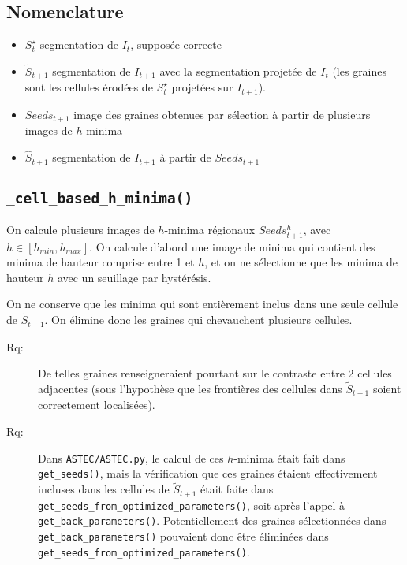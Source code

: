 \documentclass{article}
\newenvironment{remarque}{\color{red}\begin{description}\item[Rq:]}
{\end{description}\color{black}}
\begin{document}
\subsection{Nomenclature}

\begin{itemize}
\item $S^{\star}_t$ segmentation de $I_{t}$, suppos\'ee correcte
\item $\tilde{S}_{t+1}$ segmentation de $I_{t+1}$ avec la segmentation projet\'ee de $I_{t}$ (les graines sont les cellules \'erod\'ees de $S^{\star}_t$ projet\'ees sur $I_{t+1}$).
\item $Seeds_{t+1}$ image des graines obtenues par s\'election \`a partir de plusieurs images de $h$-minima
\item $\hat{S}_{t+1}$ segmentation de $I_{t+1}$ \`a partir de $Seeds_{t+1}$
\end{itemize}


\subsection{\texttt{\_cell\_based\_h\_minima()}}

On calcule plusieurs images de $h$-minima r\'egionaux $Seeds^{h}_{t+1}$, avec $h \in [h_{min}, h_{max}]$. On calcule d'abord une image de minima qui contient des minima de hauteur comprise entre 1 et $h$, et on ne s\'electionne que les minima de hauteur $h$ avec un seuillage par hyst\'er\'esis. 

On ne conserve que les minima qui sont enti\`erement inclus dans une seule cellule de $\tilde{S}_{t+1}$. On \'elimine donc les graines qui chevauchent plusieurs cellules. 
\begin{remarque}
De telles graines renseigneraient pourtant sur le contraste entre 2 cellules adjacentes (sous l'hypoth\`ese que les fronti\`eres des cellules dans $\tilde{S}_{t+1}$ soient correctement localis\'ees).
\end{remarque}
\begin{remarque}
Dans \texttt{ASTEC/ASTEC.py}, le calcul de ces $h$-minima \'etait fait dans \verb|get_seeds()|, mais la v\'erification que ces graines \'etaient effectivement incluses dans les cellules de $\tilde{S}_{t+1}$ \'etait faite dans \verb|get_seeds_from_optimized_parameters()|, soit apr\`es l'appel \`a \verb|get_back_parameters()|. 
Potentiellement des graines s\'electionn\'ees dans \verb|get_back_parameters()| pouvaient donc \^etre \'elimin\'ees dans \verb|get_seeds_from_optimized_parameters()|.
\end{remarque}
\end{document}
